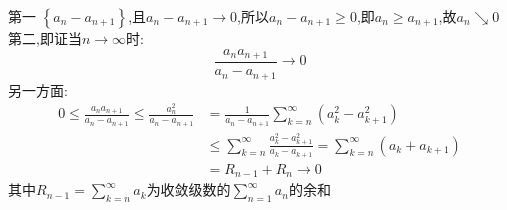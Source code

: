 \documentclass{ctexart}
\begin{document}
\begin{tcolorbox}[title = {综合性问题},colbacktitle=red!25!white,colback=white,arc = 2mm, outer arc = 2mm,fonttitle = \itshape, fontupper = \itshape, fontlower = \itshape]
\begin{tcolorbox}[colback=white,arc = 1mm, outer arc = 1mm,fonttitle = \itshape, fontupper = \itshape, fontlower = \itshape]
 		第一
 		$\left \{ a_{n}-a_{n+1} \right \} $,且$a_{n}-a_{n+1} \rightarrow 0$,所以$a_{n}-a_{n+1} \ge 0$,即$a_{n} \ge a_{n+1}$,故$a_{n} \searrow 0 $\\
 		第二,即证当$n \to \infty$时:
 		$$\frac{a_{n}a_{n+1}}{a_{n}-a_{n+1}} \rightarrow 0$$
     另一方面:
 		$$
 		\begin{aligned}
 		 0 \le \frac{a_{n}a_{n+1}}{a_{n}-a_{n+1}} \le \frac{a_{n}^{2}}{a_{n}-a_{n+1}}&=\frac{1}{a_{n}-a_{n+1}}\sum_{k=n}^{\infty}\left(a_{k}^{2}-a_{k+1}^{2} \right) \\
 		 &\le \sum_{k=n}^{\infty}\frac{a_{k}^{2}-a_{k+1}^{2}}{a_{k}-a_{k+1}}=\sum_{k=n}^{\infty}\left(a_{k}+a_{k+1} \right) \\
 		 &=R_{n-1}+R_{n} \rightarrow 0  
 		\end{aligned}
 		$$
 		其中$\displaystyle{R_{n-1}=\sum_{k=n}^{\infty}a_{k}}$为收敛级数的$\displaystyle{\sum_{n=1}^{\infty}a_{n}}$的余和
 	\end{tcolorbox}
 
 
  \end{tcolorbox}
\end{document}
